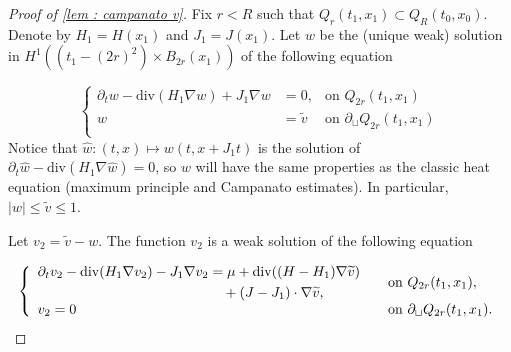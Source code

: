 \documentclass[reqno,12pt,twoside]{amsart}
\numberwithin{equation}{section} \numberwithin{theorem}{section}
\numberwithin{proposition}{section} \numberwithin{lemma}{section}
\numberwithin{corollary}{section}
\numberwithin{definition}{section} \numberwithin{remark}{section}
\begin{document}
\begin{proof}[Proof of \autoref{lem : campanato v}]
Fix $r< R$ such that $Q_{r}(t_1, x_1) \subset Q_R (t_0,x_0)$. 
Denote by $H_1 = H(x_1)$ and $J_1 = J(x_1)$. 
Let $w$ be the (unique weak) solution in $H^1((t_1 -(2r)^2) \times B_{2r}(x_1))$ of the following equation 

\[\left\{\begin{array}{rll}
\partial_t w - \text{div}(H_1 \nabla w) + J_1 \nabla w &= 0, &\text{on } Q_{2r}(t_1, x_1)\\
w &= \widetilde{v} & \text{on } \partial_{\sqcup} Q_{2r}(t_1,x_1)\\
\end{array}\right.\]
Notice that $\hat{w} : (t,x) \mapsto w(t, x +J_1t)$ is the solution of $\partial_t \hat{w} - \text{div}(H_1 \nabla \hat{w}) =0$, so $w$ will have the same properties as the classic heat equation (maximum principle and Campanato estimates). In particular, $|w| \leqslant \widetilde{v}\leqslant 1$.  

\smallskip

Let $v_2= \widetilde{v} -w$. The function $v_2$ is a weak solution of the following equation

\begin{equation}\label{camp v eq v2}
\left\{
\begin{array}{l@{\qquad}l}
\begin{split}
\partial_t v_2 - \operatorname{div}(H_1 \nabla v_2) - J_1 \nabla v_2
&= \mu + \operatorname{div}((H-H_1)\nabla \widetilde{v}) \\
&\quad + (J-J_1)\cdot \nabla \widetilde{v},
\end{split}
&
\text{on } Q_{2r}(t_1,x_1), \\[0.5ex]
v_2 =0
&
\text{on } \partial_{\sqcup}Q_{2r}(t_1,x_1).
\end{array}
\right.
\end{equation}

%


\end{proof}
\end{document}
